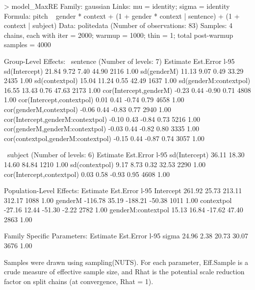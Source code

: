 \documentclass[nobib]{tufte-handout}
\begin{document}
\begin{minipage}[]{1.5\textwidth}
\begin{rc}
> model_MaxRE
 Family: gaussian 
  Links: mu = identity; sigma = identity 
Formula: pitch ~ gender * context + (1 + gender * context | sentence) + (1 + context | subject) 
   Data: politedata (Number of observations: 83) 
Samples: 4 chains, each with iter = 2000; warmup = 1000; thin = 1;
         total post-warmup samples = 4000

Group-Level Effects: 
~sentence (Number of levels: 7) 
                                   Estimate Est.Error l-95%
sd(Intercept)                         21.84      9.72     7.40    44.90       2116 1.00
sd(genderM)                           11.13      9.07     0.49    33.29       2435 1.00
sd(contextpol)                        15.04     11.24     0.55    42.49       1637 1.00
sd(genderM:contextpol)                16.55     13.43     0.76    47.63       2173 1.00
cor(Intercept,genderM)                -0.23      0.44    -0.90     0.71       4808 1.00
cor(Intercept,contextpol)              0.01      0.41    -0.74     0.79       4658 1.00
cor(genderM,contextpol)               -0.06      0.44    -0.83     0.77       2940 1.00
cor(Intercept,genderM:contextpol)     -0.10      0.43    -0.84     0.73       5216 1.00
cor(genderM,genderM:contextpol)       -0.03      0.44    -0.82     0.80       3335 1.00
cor(contextpol,genderM:contextpol)    -0.15      0.44    -0.87     0.74       3057 1.00

~subject (Number of levels: 6) 
                          Estimate Est.Error l-95%
sd(Intercept)                36.11     18.30    14.60    84.84       1210 1.00
sd(contextpol)                9.17      8.73     0.32    32.53       2290 1.00
cor(Intercept,contextpol)     0.03      0.58    -0.93     0.95       4608 1.00

Population-Level Effects: 
                   Estimate Est.Error l-95%
Intercept            261.92     25.73   213.11   312.17       1088 1.00
genderM             -116.78     35.19  -188.21   -50.38       1011 1.00
contextpol           -27.16     12.44   -51.30    -2.22       2782 1.00
genderM:contextpol    15.13     16.84   -17.62    47.40       2863 1.00

Family Specific Parameters: 
      Estimate Est.Error l-95%
sigma    24.96      2.38    20.73    30.07       3676 1.00

Samples were drawn using sampling(NUTS). For each parameter, Eff.Sample 
is a crude measure of effective sample size, and Rhat is the potential 
scale reduction factor on split chains (at convergence, Rhat = 1).
\end{rc}
\end{minipage}
\end{document}
